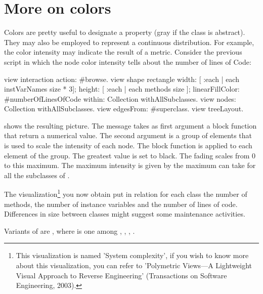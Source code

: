 \documentclass[a4paper,10pt,twoside]{book}
\begin{document}

\section{More on colors}

Colors are pretty useful to designate a property (\eg gray if the class is abstract). They may also be employed to represent a continuous distribution. For example, the color intensity may indicate the result of a metric. Consider the previous script in which the node color intensity tells about the number of lines of Code:

\begin{code}{}
view interaction action: #browse.
view shape rectangle
	width: [ :each | each instVarNames size * 3];
	height: [ :each | each methods size ];
	linearFillColor: #numberOfLinesOfCode within: Collection withAllSubclasses.
view nodes: Collection withAllSubclasses.
view edgesFrom: #superclass.
view treeLayout.
\end{code}

 shows the resulting picture. The message  takes as first argument a block function that return a numerical value. The second argument is a group of elements that is used to scale the intensity of each node. The block function is applied to each element of the group. The greatest value is set to black. The fading scales from 0 to this maximum. The maximum intensity is given by the maximum  can take for all the subclasses of . 

The visualization\footnote{This visualization is named 'System complexity', if you wish to know more about this visualization, you can refer to 'Polymetric Views---A Lightweight Visual Approach to Reverse Engineering' (Transactions on Software Engineering, 2003).} you now obtain put in relation for each class the number of methods, the number of instance variables and the number of lines of code. Differences in size between classes might suggest some maintenance activities. 

Variants of  are , where  is one among , , , .
\end{document}
